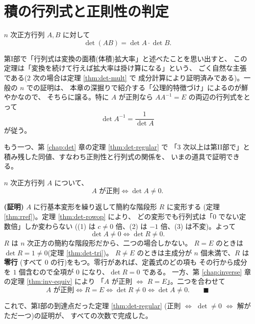 \section{積の行列式と正則性の判定}

\begin{teiri}[積の行列式]\label{thm:det-prod}
$n$ 次正方行列 $A, B$ に対して
\[
\det(AB) = \det A \cdot \det B.
\]
\end{teiri}

第I部で「行列式は変換の面積(体積)拡大率」と述べたことを思い出すと、
この定理は「変換を続けて行えば拡大率は掛け算になる」という、
ごく自然な主張である($2$ 次の場合は定理 \ref{thm:det-mult} で
成分計算により証明済みである)。一般の $n$ での証明は、
本章の深掘りで紹介する「公理的特徴づけ」によるのが鮮やかなので、
そちらに譲る。特に $A$ が正則なら $AA^{-1} = E$ の両辺の行列式をとって
\[
\det A^{-1} = \frac{1}{\det A}
\]
が従う。

もう一つ、第 \ref{chap:det} 章の定理 \ref{thm:det-regular} で
「$3$ 次以上は第II部で」と積み残した同値、すなわち正則性と行列式の関係を、
いまの道具で証明できる。

\begin{teiri}\label{thm:det-nonzero}
$n$ 次正方行列 $A$ について、
\[
A \text{ が正則} \iff \det A \neq 0.
\]
\end{teiri}

\noindent\textbf{(証明)}\quad
$A$ に行基本変形を繰り返して簡約な階段形 $R$ に変形する
(定理 \ref{thm:rref})。定理 \ref{thm:det-rowop} により、
どの変形でも行列式は「$0$ でない定数倍」しか変わらない
((1) は $c \neq 0$ 倍、(2) は $-1$ 倍、(3) は不変)。よって
\[
\det A \neq 0 \iff \det R \neq 0.
\]
$R$ は $n$ 次正方の簡約な階段形だから、二つの場合しかない。
$R = E$ のときは $\det R = 1 \neq 0$(定理 \ref{thm:det-tri})。
$R \neq E$ のときは主成分が $n$ 個未満で、$R$ は\textbf{零行}
(すべて $0$ の行)をもつ。零行があれば、定義式のどの項も
その行から成分を $1$ 個含むので全項が $0$ になり、$\det R = 0$ である。
一方、第 \ref{chap:inverse} 章の定理 \ref{thm:inv-equiv} により
「$A$ が正則 $\iff$ $R = E$」。二つを合わせて
\[
A \text{ が正則} \iff R = E \iff \det R \neq 0 \iff \det A \neq 0.
\qquad\blacksquare
\]

これで、第I部の到達点だった定理 \ref{thm:det-regular}
(正則 $\iff$ $\det \neq 0$ $\iff$ 解がただ一つ)の証明が、
すべての次数で完成した。

